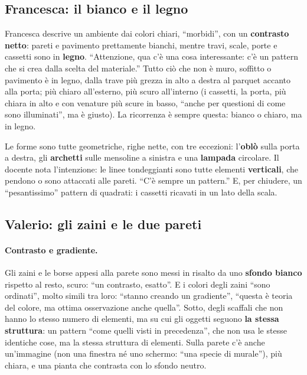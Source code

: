 \subsection{Francesca: il bianco e il legno}

Francesca descrive un ambiente dai colori chiari, ``morbidi'', con un \textbf{contrasto
netto}: pareti e pavimento prettamente bianchi, mentre travi, scale, porte e cassetti sono
in \textbf{legno}. ``Attenzione, qua c'è una cosa interessante: c'è un pattern che si crea
dalla scelta del materiale.'' Tutto ciò che non è muro, soffitto o pavimento è in legno,
dalla trave più grezza in alto a destra al parquet accanto alla porta; più chiaro
all'esterno, più scuro all'interno (i cassetti, la porta, più chiara in alto e con
venature più scure in basso, ``anche per questioni di come sono illuminati'', ma è
giusto). La ricorrenza è sempre questa: bianco o chiaro, ma in legno.

Le forme sono tutte geometriche, righe nette, con tre eccezioni: l'\textbf{oblò} sulla
porta a destra, gli \textbf{archetti} sulle mensoline a sinistra e una
\textbf{lampada} circolare. Il docente nota l'intenzione: le linee tondeggianti sono tutte
elementi \textbf{verticali}, che pendono o sono attaccati alle pareti. ``C'è sempre un
pattern.'' E, per chiudere, un ``pesantissimo'' pattern di quadrati: i cassetti ricavati
in un lato della scala.

\subsection{Valerio: gli zaini e le due pareti}

\paragraph{Contrasto e gradiente.} Gli zaini e le borse appesi alla parete sono messi in
risalto da uno \textbf{sfondo bianco} rispetto al resto, scuro: ``un contrasto, esatto''.
E i colori degli zaini ``sono ordinati'', molto simili tra loro: ``stanno creando un
gradiente'', ``questa è teoria del colore, ma ottima osservazione anche quella''. Sotto,
degli scaffali che non hanno lo stesso numero di elementi, ma su cui gli oggetti seguono
\textbf{la stessa struttura}: un pattern ``come quelli visti in precedenza'', che non usa
le stesse identiche cose, ma la stessa struttura di elementi. Sulla parete c'è anche
un'immagine (non una finestra né uno schermo: ``una specie di murale''), più chiara, e
una pianta che contrasta con lo sfondo neutro.

